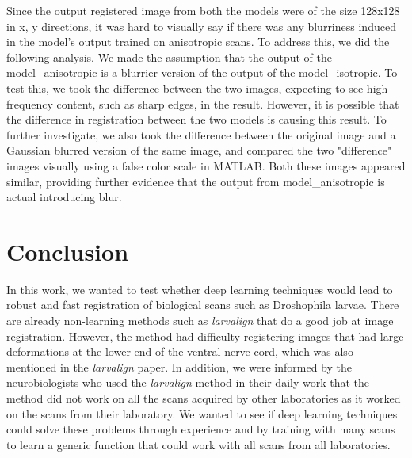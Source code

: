 \documentclass{book}
\begin{document}
	Since the output registered image from both the models were of the size 128x128 in x, y directions, it was hard to visually say if there was any blurriness induced in the model's output trained on anisotropic scans. To address this, we did the following analysis. We made the assumption that the output of the model\_anisotropic is a blurrier version of the output of the model\_isotropic. To test this, we took the difference between the two images, expecting to see high frequency content, such as sharp edges, in the result. However, it is possible that the difference in registration between the two models is causing this result. To further investigate, we also took the difference between the original image and a Gaussian blurred version of the same image, and compared the two "difference" images visually using a false color scale in MATLAB. Both these images appeared similar, providing further evidence that the output from model\_anisotropic is actual introducing blur.
	
	\chapter{Conclusion}
	In this work, we wanted to test whether deep learning techniques would lead to robust and fast registration of biological scans such as Droshophila larvae. There are already non-learning methods such as \textit{larvalign} that do a good job at image registration. However, the method had difficulty registering images that had large deformations at the lower end of the ventral nerve cord, which was also mentioned in the \textit{larvalign} paper. In addition, we were informed by the neurobiologists who used the \textit{larvalign} method in their daily work that the method did not work on all the scans acquired by other laboratories as it worked on the scans from their laboratory. We wanted to see if deep learning techniques could solve these problems through experience and by training with many scans to learn a generic function that could work with all scans from all laboratories.
\end{document}
